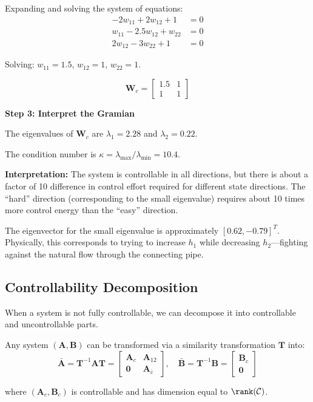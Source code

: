 \begin{example}
Expanding and solving the system of equations:
\begin{align}
-2w_{11} + 2w_{12} + 1 &= 0 \\
w_{11} - 2.5w_{12} + w_{22} &= 0 \\
2w_{12} - 3w_{22} + 1 &= 0
\end{align}

Solving: $w_{11} = 1.5$, $w_{12} = 1$, $w_{22} = 1$.

\begin{equation}
\mathbf{W}_c = \begin{bmatrix} 1.5 & 1 \\ 1 & 1 \end{bmatrix}
\end{equation}

\textbf{Step 3: Interpret the Gramian}

The eigenvalues of $\mathbf{W}_c$ are $\lambda_1 = 2.28$ and $\lambda_2 = 0.22$.

The condition number is $\kappa = \lambda_{\max}/\lambda_{\min} = 10.4$.

\textbf{Interpretation:} The system is controllable in all directions, but there is about a factor of 10 difference in control effort required for different state directions. The ``hard'' direction (corresponding to the small eigenvalue) requires about 10 times more control energy than the ``easy'' direction.

The eigenvector for the small eigenvalue is approximately $[0.62, -0.79]^T$. Physically, this corresponds to trying to increase $h_1$ while decreasing $h_2$---fighting against the natural flow through the connecting pipe.
\end{example}

\subsection{Controllability Decomposition}

When a system is not fully controllable, we can decompose it into controllable and uncontrollable parts.

\begin{theorem}
Any system $(\mathbf{A}, \mathbf{B})$ can be transformed via a similarity transformation $\mathbf{T}$ into:
\begin{equation}
\bar{\mathbf{A}} = \mathbf{T}^{-1}\mathbf{A}\mathbf{T} = \begin{bmatrix} \mathbf{A}_c & \mathbf{A}_{12} \\ \mathbf{0} & \mathbf{A}_{\bar{c}} \end{bmatrix}, \quad
\bar{\mathbf{B}} = \mathbf{T}^{-1}\mathbf{B} = \begin{bmatrix} \mathbf{B}_c \\ \mathbf{0} \end{bmatrix}
\end{equation}

where $(\mathbf{A}_c, \mathbf{B}_c)$ is controllable and has dimension equal to $\rank(\mathcal{C})$.
\end{theorem}


